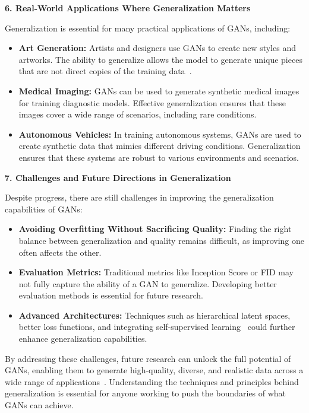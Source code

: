 \textbf{6. Real-World Applications Where Generalization Matters}

Generalization is essential for many practical applications of GANs, including:
\begin{itemize}
    \item \textbf{Art Generation:} Artists and designers use GANs to create new styles and artworks. The ability to generalize allows the model to generate unique pieces that are not direct copies of the training data~\cite{karras2019style}.
    \item \textbf{Medical Imaging:} GANs can be used to generate synthetic medical images for training diagnostic models. Effective generalization ensures that these images cover a wide range of scenarios, including rare conditions.
    \item \textbf{Autonomous Vehicles:} In training autonomous systems, GANs are used to create synthetic data that mimics different driving conditions. Generalization ensures that these systems are robust to various environments and scenarios.
\end{itemize}

\textbf{7. Challenges and Future Directions in Generalization}

Despite progress, there are still challenges in improving the generalization capabilities of GANs:
\begin{itemize}
    \item \textbf{Avoiding Overfitting Without Sacrificing Quality:} Finding the right balance between generalization and quality remains difficult, as improving one often affects the other.
    \item \textbf{Evaluation Metrics:} Traditional metrics like Inception Score or FID may not fully capture the ability of a GAN to generalize. Developing better evaluation methods is essential for future research.
    \item \textbf{Advanced Architectures:} Techniques such as hierarchical latent spaces, better loss functions, and integrating self-supervised learning~\cite{zhang2019self} could further enhance generalization capabilities.
\end{itemize}

By addressing these challenges, future research can unlock the full potential of GANs, enabling them to generate high-quality, diverse, and realistic data across a wide range of applications~\cite{liu2021self}. Understanding the techniques and principles behind generalization is essential for anyone working to push the boundaries of what GANs can achieve.


